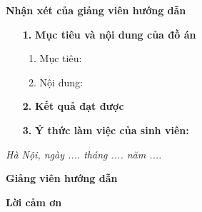 \documentclass[14pt,oneside,A4paper,openright]{report}
\theoremstyle{plain}
\renewcommand{\large}{\fontsize{14pt}{14pt}\selectfont}
\begin{document}
\large

\newpage

\newpage
\thispagestyle{empty}
\thisfancypage{
	\setlength{\fboxsep}{0cm}
	\fbox}{}

\fontsize{22pt}{16pt}\selectfont
\bigbreak
\begin{center}
	{\bf Nhận xét của giảng viên hướng dẫn}
\end{center}
\bigbreak

\fontsize{12pt}{14pt}\selectfont
\begin{enumerate}
	\item [{\bf 1.}]{\bf Mục tiêu và nội dung của đồ án}
	\begin{enumerate}
		\item Mục tiêu: 
		\vspace{40pt}
		\item Nội dung: 
		\vspace{40pt}
	\end{enumerate}
	\item [{\bf 2.}] {\bf Kết quả đạt được} 
	\vspace{60pt}
	\item [{\bf 3.}]{\bf Ý thức làm việc của sinh viên:}
    \vspace{60pt}
\end{enumerate}


\bigskip 
\hspace{7cm}
{\it Hà Nội, ngày .... tháng .... năm ....}

\hspace{7.8cm} {\bf Giảng viên hướng dẫn}

\vspace{2 cm}



\pagestyle{fancy}
\cfoot{\fontsize{13pt}{18pt} \selectfont \thepage}
\newpage
\begin{center}
\fontsize{22pt}{16pt}\selectfont
{\bfseries Lời cảm ơn}
\fontsize{13pt}{16pt}\selectfont
\end{center}
\bigskip

%
%
%
\end{document}
